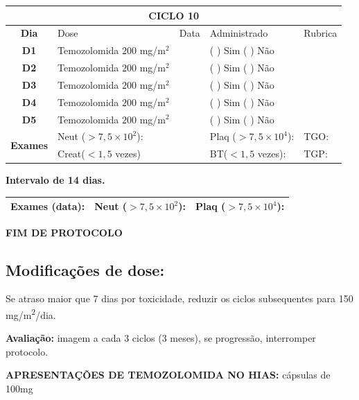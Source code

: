 \documentclass[11pt,a4paper,oldfontcommands]{memoir}
\begin{document}
\begin{center}
\begin{longtable}{p{1cm}p{4cm}|p{1cm}|p{4.6cm}|p{3cm}}
	\hline
	\multicolumn{5}{c}{\textbf{CICLO 10}}\\
\hline
    \multicolumn{1}{c|}{\multirow{1}{*}{\textbf{Dia}}}&{Dose}&{Data}&{Administrado}&{Rubrica} \\
    \hline
    \multicolumn{1}{c|}{\multirow{1}{*}{\textbf{D1}}}&{Temozolomida \(200\) mg/m\(^2\)}&&{(  ) Sim (  ) Não}&\\
    \multicolumn{1}{c|}{\multirow{1}{*}{\textbf{D2}}}&{Temozolomida \(200\) mg/m\(^2\)}&&{(  ) Sim (  ) Não}&\\
    \multicolumn{1}{c|}{\multirow{1}{*}{\textbf{D3}}}&{Temozolomida \(200\) mg/m\(^2\)}&&{(  ) Sim (  ) Não}&\\
    \multicolumn{1}{c|}{\multirow{1}{*}{\textbf{D4}}}&{Temozolomida \(200\) mg/m\(^2\)}&&{(  ) Sim (  ) Não}&\\
    \multicolumn{1}{c|}{\multirow{1}{*}{\textbf{D5}}}&{Temozolomida \(200\) mg/m\(^2\)}&&{(  ) Sim (  ) Não}&\\
    \hline
    \multicolumn{1}{c|}{\multirow{2}{*}{\textbf{Exames}}}&\multicolumn{2}{l|}{Neut (\(>7,5\times10^2\)):}&{Plaq (\(>7,5\times10^4\)):}&{TGO:}\\
    \cline{2-5}
    \multicolumn{1}{c|}{\multirow{2}{*}{{}}}&\multicolumn{2}{l|}{Creat(\(<1,5\) vezes)}&{BT(\(<1,5\) vezes):}&{TGP:}
    \\
    \hline
\end{longtable}
\textbf{Intervalo de 14 dias.}
\begin{longtable}{p{5cm}|p{5cm}|p{4.5cm}}
    \hline
    \textbf{Exames (data):}&{Neut (\(>7,5\times10^2\)):}&{Plaq (\(>7,5\times10^4\)):}
    \\
    \hline
\end{longtable}

\textbf{FIM DE PROTOCOLO}

\end{center}
\subsection{Modificações de dose:}
Se atraso maior que 7 dias por toxicidade, reduzir os ciclos subsequentes para 150 mg/m\textsuperscript{2}/dia.

\textbf{Avaliação:} imagem a cada 3 ciclos (3 meses), se progressão, interromper protocolo.

\textbf{APRESENTAÇÕES DE TEMOZOLOMIDA NO HIAS:} cápsulas de 100mg
\end{document}
